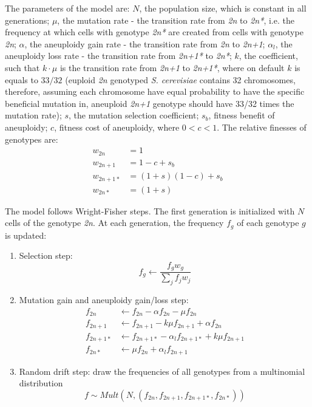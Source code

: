 \documentclass[12pt]{extarticle}
\begin{document}
The parameters of the model are: 
$N$, the population size, which is constant in all generations; $\mu$, the mutation rate - the transition rate from \emph{2n} to \emph{2n*}, i.e. the frequency at which cells with genotype \emph{2n*}
are created from cells with genotype \emph{2n}; $\alpha$, the aneuploidy gain rate - the transition rate from \emph{2n} to \emph{2n+1}; 
$\alpha_l$, the aneuploidy loss rate - the transition rate from \emph{2n+1*} to \emph{2n*}; $k$, the coefficient, such that $k\cdot\mu$ is the transition rate from \emph{2n+1} to \emph{2n+1*}, 
where on default $k$ is equals to $33/32$ (euploid \emph{2n} genotyped \emph{S. cerevisiae} contains 32 chromosomes, therefore, assuming each chromosome have equal probability to have the specific 
beneficial mutation in, aneuploid \emph{2n+1} genotype should have 33/32 times the mutation rate); $s$, the mutation selection coefficient; $s_b$, fitness benefit of aneuploidy; 
$c$, fitness cost of aneuploidy, where $0<c<1$. The relative finesses of genotypes are:
\begin{equation} \label{eq:single-w} \begin{aligned}
w_{2n} & = 1 \\
w_{2n+1} & = 1-c+s_b \\
w_{2n+1*} & = (1+s)(1-c)+s_b \\
w_{2n*} & = (1+s) \;
\end{aligned}
\end{equation}

\pagebreak

The model follows Wright-Fisher \citep{Tenaillon1999} steps. The first generation is initialized with $N$ cells of the genotype \emph{2n}. At each generation, the frequency $f_g$ of 
each genotype $g$ is updated:
\begin{enumerate}
  \item Selection step: 
    \begin{equation} \label{eq:single-selection} 
      f_g\gets{\dfrac{f_g w_g}{\sum_{j}f_j w_j}}
    \end{equation}
  \item Mutation gain and aneuploidy gain/loss step:
    \begin{equation} \label{eq:single-mutation} \begin{aligned}
      f_{2n} & \gets{f_{2n} - \alpha f_{2n} - \mu f_{2n}}  \\
      f_{2n+1} & \gets{f_{2n+1} - k\mu f_{2n+1} + \alpha f_{2n}}  \\
      f_{2n+1*} & \gets{f_{2n+1*} - \alpha_l f_{2n+1*} + k\mu f_{2n+1}}  \\
      f_{2n*} & \gets{\mu f_{2n} + \alpha_l f_{2n+1}}  \;
    \end{aligned}
    \end{equation}
  \item Random drift step: draw the frequencies of all genotypes from a multinomial distribution
    \begin{equation} \label{eq:single-mutation} 
      f \sim Mult(N, (f_{2n},f_{2n+1},f_{2n+1*},f_{2n*}))
    \end{equation}
\end{enumerate}
\end{document}
